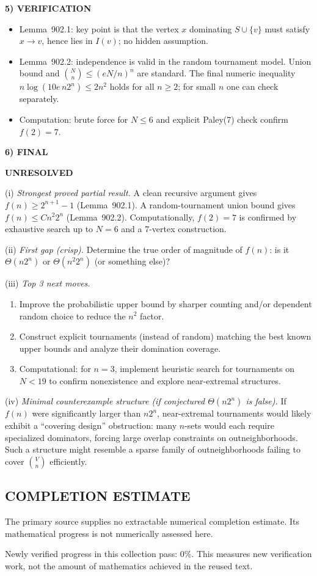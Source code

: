 \medskip
\noindent\textbf{5) VERIFICATION}

\begin{itemize}
\item Lemma~902.1: key point is that the vertex $x$ dominating $S\cup\{v\}$ must
satisfy $x\to v$, hence lies in $I(v)$; no hidden assumption.
\item Lemma~902.2: independence is valid in the random tournament model.
Union bound and $\binom{N}{n}\le (eN/n)^n$ are standard.
The final numeric inequality $n\log(10e\,n2^n)\le 2n^2$ holds for all $n\ge 2$;
for small $n$ one can check separately.
\item Computation: brute force for $N\le 6$ and explicit Paley(7) check confirm
$f(2)=7$.
\end{itemize}

\medskip
\noindent\textbf{6) FINAL}

\textbf{UNRESOLVED}

(i) \emph{Strongest proved partial result.}
A clean recursive argument gives $f(n)\ge 2^{n+1}-1$ (Lemma~902.1).
A random-tournament union bound gives $f(n)\le C n^2 2^n$ (Lemma~902.2).
Computationally, $f(2)=7$ is confirmed by exhaustive search up to $N=6$ and a
7-vertex construction.

(ii) \emph{First gap (crisp).}
Determine the true order of magnitude of $f(n)$: is it $\Theta(n2^n)$ or
$\Theta(n^2 2^n)$ (or something else)?

(iii) \emph{Top 3 next moves.}
\begin{enumerate}
\item Improve the probabilistic upper bound by sharper counting and/or dependent
random choice to reduce the $n^2$ factor.
\item Construct explicit tournaments (instead of random) matching the best known
upper bounds and analyze their domination coverage.
\item Computational: for $n=3$, implement heuristic search for tournaments on
$N<19$ to confirm nonexistence and explore near-extremal structures.
\end{enumerate}

(iv) \emph{Minimal counterexample structure (if conjectured $\Theta(n2^n)$ is false).}
If $f(n)$ were significantly larger than $n2^n$, near-extremal tournaments would
likely exhibit a “covering design” obstruction: many $n$-sets would each require
specialized dominators, forcing large overlap constraints on outneighborhoods.
Such a structure might resemble a sparse family of outneighborhoods failing to
cover $\binom{V}{n}$ efficiently.


\subsection*{COMPLETION ESTIMATE}
The primary source supplies no extractable numerical completion estimate. Its mathematical progress is not numerically assessed here.

Newly verified progress in this collection pass: $0\%$. This measures new verification work, not the amount of mathematics achieved in the reused text.
